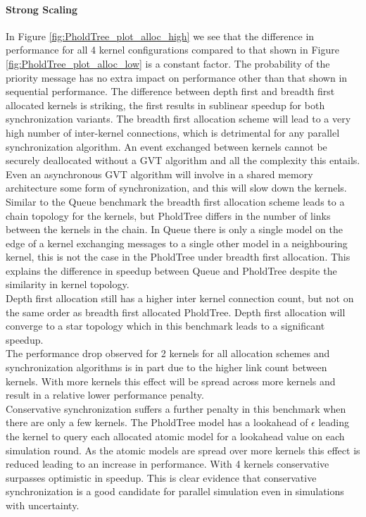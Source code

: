 \paragraph*{Strong Scaling}\label{pholdtreestrongscale}
In Figure \ref{fig:PholdTree_plot_alloc_high} we see that the difference in performance for all 4 kernel configurations compared to that shown in Figure \ref{fig:PholdTree_plot_alloc_low} is a constant factor. The probability of the priority message has no extra impact on performance other than that shown in sequential performance. 
The difference between depth first and breadth first allocated kernels is striking, the first results in sublinear speedup for both synchronization variants. %
The breadth first allocation scheme will lead to a very high number of inter-kernel connections, which is detrimental for any parallel synchronization algorithm. An event exchanged between kernels cannot be securely deallocated without a GVT algorithm and all the complexity this entails. Even an asynchronous GVT algorithm will involve in a shared memory architecture some form of synchronization, and this will slow down the kernels. \\
Similar to the Queue benchmark the breadth first allocation scheme leads to a chain topology for the kernels, but PholdTree differs in the number of links between the kernels in the chain. In Queue there is only a single model on the edge of a kernel exchanging messages to a single other model in a neighbouring kernel, this is not the case in the PholdTree under breadth first allocation. This explains the difference in speedup between Queue and PholdTree despite the similarity in kernel topology.\\
Depth first allocation still has a higher inter kernel connection count, but not on the same order as breadth first allocated PholdTree. Depth first allocation will converge to a star topology which in this benchmark leads to a significant speedup.\\
The performance drop observed for 2 kernels for all allocation schemes and synchronization algorithms is in part due to the higher link count between kernels. With more kernels this effect will be spread across more kernels and result in a relative lower performance penalty. \\
Conservative synchronization suffers a further penalty in this benchmark when there are only a few kernels. The PholdTree model has a lookahead of $\epsilon$ leading the kernel to query each allocated atomic model for a lookahead value on each simulation round. As the atomic models are spread over more kernels this effect is reduced leading to an increase in performance. With 4 kernels conservative surpasses optimistic in speedup. This is clear evidence that conservative synchronization is a good candidate for parallel simulation even in simulations with uncertainty.
